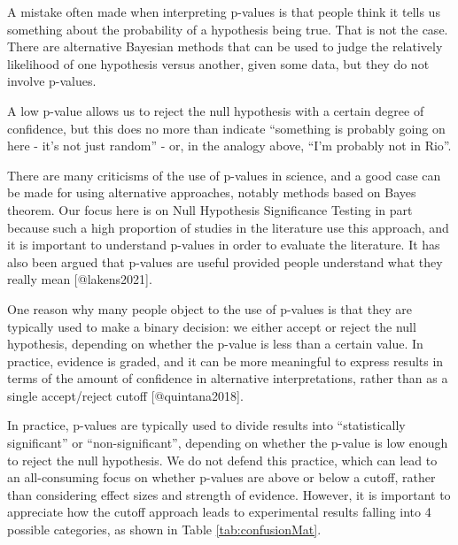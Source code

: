 \documentclass{krantz}
\begin{document}
A mistake often made when interpreting p-values is that people think it tells us something about the probability of a hypothesis being true. That is not the case. There are alternative Bayesian methods that can be used to judge the relatively likelihood of one hypothesis versus another, given some data, but they do not involve p-values.

A low p-value allows us to reject the null hypothesis with a certain degree of confidence, but this does no more than indicate ``something is probably going on here - it's not just random'' - or, in the analogy above, ``I'm probably not in Rio''.

\begin{tcolorbox}[colback=Black!5!lightgray,colframe=black!75!black,coltitle=white,title=Criticisms of the use of p-values]\label{box:pvalues}
There are many criticisms of the use of p-values in science, and a good case can be made for using alternative approaches, notably methods based on Bayes theorem. Our focus here is on Null Hypothesis Significance Testing in part because such a high proportion of studies in the literature use this approach, and it is important to understand p-values in order to evaluate the literature. It has also been argued that p-values are useful provided people understand what they really mean [@lakens2021].

One reason why many people object to the use of p-values is that they are typically used to make a binary decision: we either accept or reject the null hypothesis, depending on whether the p-value is less than a certain value. In practice, evidence is graded, and it can be more meaningful to express results in terms of the amount of confidence in alternative interpretations, rather than as a single accept/reject cutoff [@quintana2018].
\end{tcolorbox}

In practice, p-values are typically used to divide results into ``statistically significant'' or ``non-significant'', depending on whether the p-value is low enough to reject the null hypothesis. We do not defend this practice, which can lead to an all-consuming focus on whether p-values are above or below a cutoff, rather than considering effect sizes and strength of evidence. However, it is important to appreciate how the cutoff approach leads to experimental results falling into 4 possible categories, as shown in Table \ref{tab:confusionMat}.
\end{document}
